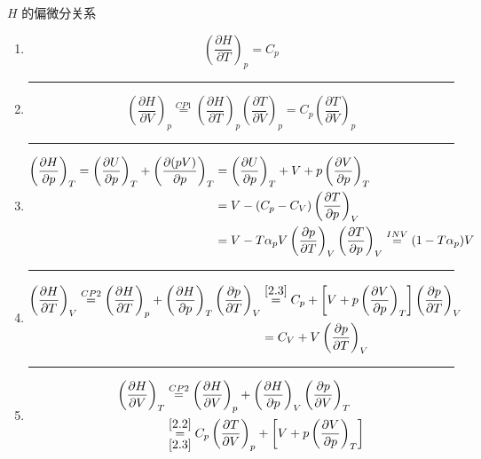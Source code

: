 \begin{example}
    \( H \) 的偏微分关系
    \begin{enumerate}
        \item \[\left(\frac{\partial H}{\partial T}\right)_p = C_p \]
        \hrule
        \item\label{2.2} \[\left(\frac{\partial H}{\partial V}\right)_p 
        \overset{CP1}{=} \left(\frac{\partial H}{\partial T}\right)_p \left(\frac{\partial T}{\partial V}\right)_p 
        = C_p \left(\frac{\partial T}{\partial V}\right)_p 
        \]
        \hrule
        \item\label{2.3} \begin{align*}
        \left(\frac{\partial H}{\partial p}\right)_T 
        = \left(\frac{\partial U}{\partial p}\right)_T 
        + \left(\frac{\partial (pV)}{\partial p}\right)_T 
        &= \left(\frac{\partial U}{\partial p}\right)_T 
        + V + p\left(\frac{\partial V}{\partial p}\right)_T \\
        &=V-(C_p-C_V)\left(\frac{\partial T}{\partial p}\right)_V\\
        &=V-T \alpha_pV \left( \frac{\partial p}{\partial T} \right)_V
        \left(\frac{\partial T}{\partial p}\right)_V \overset{INV}{=}(1-T \alpha_p)V
        \end{align*}
        \hrule
        \item\label{2.4} \begin{align*}
            \left(\frac{\partial H}{\partial T}\right)_V 
            \overset{CP2}{=} \left(\frac{\partial H}{\partial T}\right)_p 
            + \left(\frac{\partial H}{\partial p}\right)_T \left(\frac{\partial p}{\partial T}\right)_V 
            &\overset{\ref*{2.3}}{=} C_p + \left[ V 
            + p\left(\frac{\partial V}{\partial p}\right)_T \right]
            \left(\frac{\partial p}{\partial T}\right)_V \\
            &=C_V + V\left(\frac{\pa p}{\pa T}\right)_V
        \end{align*}
        \hrule
        \item\label{2.5} \begin{align*}
            \left(\frac{\partial H}{\partial V}\right)_T 
            &\overset{CP2}{=} \left(\frac{\partial H}{\partial V}\right)_p 
            + \left(\frac{\partial H}{\partial p}\right)_V \left(\frac{\partial p}{\partial V}\right)_T \\
            &\overunderset{\ref*{2.2}}{\ref*{2.3}}{=} 
            C_p \left(\frac{\partial T}{\partial V}\right)_p 
            + \left[ V + p\left(\frac{\partial V}{\partial p}\right)_T \right] 

\end{align*}
\end{enumerate}
\end{example}
